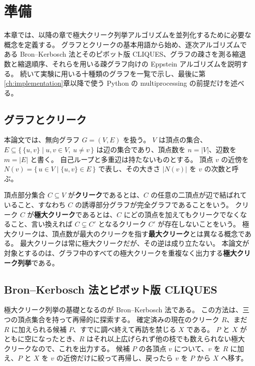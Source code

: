 \chapter{準備}
\label{ch:preliminaries}

本章では、以降の章で極大クリーク列挙アルゴリズムを並列化するために必要な概念を定義する。
グラフとクリークの基本用語から始め、逐次アルゴリズムである Bron--Kerbosch 法とそのピボット版 CLIQUES、グラフの疎さを測る縮退数と縮退順序、それらを用いる疎グラフ向けの Eppstein アルゴリズムを説明する。
続いて実験に用いる十種類のグラフを一覧で示し、最後に第\ref{ch:implementation}章以降で使う Python の multiprocessing の前提だけを述べる。

\section{グラフとクリーク}
\label{sec:graph-clique}

本論文では、無向グラフ $G = (V, E)$ を扱う。
$V$ は頂点の集合、$E \subseteq \{\, \{u, v\} \mid u, v \in V,\ u \neq v \,\}$ は辺の集合であり、頂点数を $n = |V|$、辺数を $m = |E|$ と書く。
自己ループと多重辺は持たないものとする。
頂点 $v$ の近傍を $N(v) = \{\, u \in V \mid \{u, v\} \in E \,\}$ で表し、その大きさ $|N(v)|$ を $v$ の次数と呼ぶ。

頂点部分集合 $C \subseteq V$ が\textbf{クリーク}であるとは、$C$ の任意の二頂点が辺で結ばれていること、すなわち $C$ の誘導部分グラフが完全グラフであることをいう。
クリーク $C$ が\textbf{極大クリーク}であるとは、$C$ にどの頂点を加えてもクリークでなくなること、言い換えれば $C \subsetneq C'$ となるクリーク $C'$ が存在しないことをいう。
極大クリークは、頂点数が最大のクリークを指す\textbf{最大クリーク}とは異なる概念である。
最大クリークは常に極大クリークだが、その逆は成り立たない。
本論文が対象とするのは、グラフ中のすべての極大クリークを重複なく出力する\textbf{極大クリーク列挙}である。

\section{Bron--Kerbosch 法とピボット版 CLIQUES}
\label{sec:bron-kerbosch}

極大クリーク列挙の基礎となるのが Bron--Kerbosch 法である。
この方法は、三つの頂点集合を持って再帰的に探索する。
確定済みの現在のクリーク $R$、まだ $R$ に加えられる候補 $P$、すでに調べ終えて再訪を禁じる $X$ である。
$P$ と $X$ がともに空になったとき、$R$ はそれ以上広げられず他の枝でも数えられない極大クリークなので、これを出力する。
候補 $P$ の各頂点 $v$ について、$v$ を $R$ に加え、$P$ と $X$ を $v$ の近傍だけに絞って再帰し、戻ったら $v$ を $P$ から $X$ へ移す。

